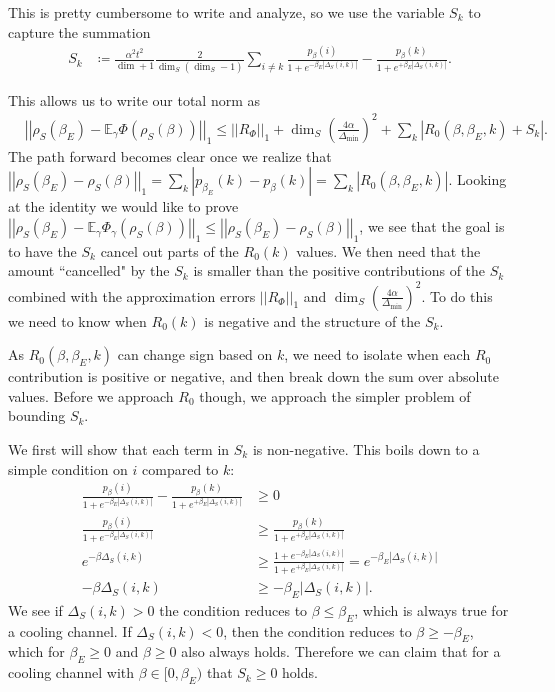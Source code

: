 \documentclass{article}
\newcommand{\parens}[1]{\left( #1 \right)}
\newcommand{\abs}[1]{\left| #1 \right|}
\newcommand{\norm}[1]{\left| \left| #1 \right| \right|}
\begin{document}
This is pretty cumbersome to write and analyze, so we use the variable $S_k$ to capture the summation
\begin{align}
    S_k &\coloneqq \frac{\alpha^2 t^2}{\dim + 1} \frac{2}{\dim_S (\dim_S - 1)} \sum_{i \neq k} \frac{p_{\beta}(i)}{1 + e^{- \beta_E |\Delta_S(i,k)|}} - \frac{p_{\beta}(k)}{1 + e^{+ \beta_E |\Delta_S(i,k)|}}. \label{eq:single_shot_sum_def}
\end{align}

This allows us to write our total norm as
\begin{align}
    &\norm{\rho_S(\beta_E) - \mathbb{E}_{\gamma} \Phi(\rho_S(\beta)) }_1 \leq \norm{R_{\Phi}}_1 + \dim_S \parens{\frac{4 \alpha}{\Delta_{\min}}}^2 + \sum_k \abs{ R_0(\beta, \beta_E, k) + S_k }. \label{eq:single_shot_capture_sum}
\end{align}
The path forward becomes clear once we realize that $\norm{\rho_S(\beta_E) - \rho_S(\beta)}_1 = \sum_k \abs{p_{\beta_E}(k) - p_{\beta}(k)} = \sum_k \abs{R_0(\beta, \beta_E, k)}$. Looking at the identity we would like to prove $\norm{\rho_S(\beta_E) - \mathbb{E}_{\gamma} \Phi_{\gamma}(\rho_S(\beta))}_1 \leq \norm{\rho_S(\beta_E) - \rho_S(\beta)}_1$, we see that the goal is to have the $S_k$ cancel out parts of the $R_0(k)$ values. We then need that the amount ``cancelled" by the $S_k$ is smaller than the positive contributions of the $S_k$ combined with the approximation errors $\norm{R_{\Phi}}_1$ and $\dim_S \parens{\frac{4 \alpha}{\Delta_{\min}}}^2$. To do this we need to know when $R_0(k)$ is negative and the structure of the $S_k$. 

As $R_0(\beta, \beta_E, k)$ can change sign based on $k$, we need to isolate when each $R_0$ contribution is positive or negative, and then break down the sum over absolute values. Before we approach $R_0$ though, we approach the simpler problem of bounding $S_k$. 

We first will show that each term in $S_k$ is non-negative. This boils down to a simple condition on $i$ compared to $k$: 
\begin{align}
    \frac{p_{\beta}(i)}{1 + e^{- \beta_E |\Delta_S(i,k)|}} - \frac{p_{\beta}(k)}{1 + e^{+ \beta_E |\Delta_S(i,k)|}} &\geq 0 \\
    \frac{p_{\beta}(i)}{1 + e^{-\beta_E |\Delta_S(i,k)|}} &\geq \frac{p_{\beta}(k)}{1 + e^{+\beta_E |\Delta_S(i,k)|}} \\
    e^{-\beta \Delta_S(i,k)} &\geq \frac{1 + e^{-\beta_E |\Delta_S(i,k)|}}{1 + e^{+ \beta_E |\Delta_S(i,k)|}} = e^{-\beta_E |\Delta_S(i,k)|} \\
    -\beta \Delta_S(i,k) &\geq -\beta_E |\Delta_S(i,k)|.
\end{align}
We see if $\Delta_S(i,k) > 0$ the condition reduces to $\beta \leq \beta_E$, which is always true for a cooling channel. If $\Delta_S(i,k) < 0$, then the condition reduces to $\beta \geq - \beta_E$, which for $\beta_E \geq 0$ and $\beta \geq 0$ also always holds. Therefore we can claim that for a cooling channel with $\beta \in [0, \beta_E)$ that $S_k \geq 0$ holds.
\end{document}

